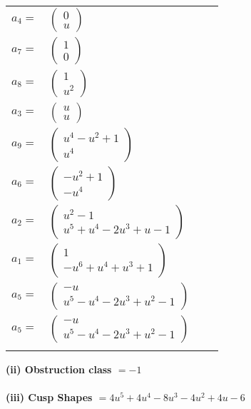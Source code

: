 \documentclass[1p]{elsarticle_modified}
\theoremstyle{definition}
\begin{document}
\begin{tabular}{m{7pt} m{180pt} m{7pt} m{180pt} }
\flushright $a_{4}=$&$\begin{pmatrix}0\\u\end{pmatrix}$ \\
\flushright $a_{7}=$&$\begin{pmatrix}1\\0\end{pmatrix}$ \\
\flushright $a_{8}=$&$\begin{pmatrix}1\\u^2\end{pmatrix}$ \\
\flushright $a_{3}=$&$\begin{pmatrix}u\\u\end{pmatrix}$ \\
\flushright $a_{9}=$&$\begin{pmatrix}u^4- u^2+1\\u^4\end{pmatrix}$ \\
\flushright $a_{6}=$&$\begin{pmatrix}- u^2+1\\- u^4\end{pmatrix}$ \\
\flushright $a_{2}=$&$\begin{pmatrix}u^2-1\\u^5+u^4-2 u^3+u-1\end{pmatrix}$ \\
\flushright $a_{1}=$&$\begin{pmatrix}1\\- u^6+u^4+u^3+1\end{pmatrix}$ \\
\flushright $a_{5}=$&$\begin{pmatrix}- u\\u^5- u^4-2 u^3+u^2-1\end{pmatrix}$\\ \flushright $a_{5}=$&$\begin{pmatrix}- u\\u^5- u^4-2 u^3+u^2-1\end{pmatrix}$\\&\end{tabular}
\flushleft \textbf{(ii) Obstruction class $= -1$}\\~\\
\flushleft \textbf{(iii) Cusp Shapes $= 4 u^5+4 u^4-8 u^3-4 u^2+4 u-6$}\\~\\
\end{document}
